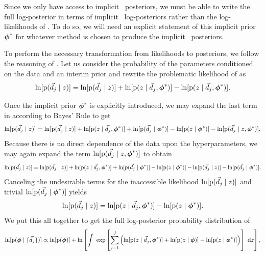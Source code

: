 Since we only have access to implicit \pz\ posteriors, we must be able to write the full log-posterior in terms of implicit \pz\ log-posteriors rather than the log-likelihoods of .
To do so, we will need an explicit statement of this implicit prior ${\boldsymbol{\phi}}^{*}$ for whatever method is chosen to produce the implicit \pz\ posteriors.  

To perform the necessary transformation from likelihoods to posteriors, we follow the reasoning of \citet{Foreman-Mackey2014}.  
Let us consider the probability of the parameters conditioned on the data and an interim prior and rewrite the problematic likelihood of  as 
\begin{equation}
\eqlabel{eq:trick}
\ln[\pr{\data_{j} \gvn z}] = \ln[\pr{\data_{j} \gvn z}] + \ln[\pr{z \gvn \data_{j}, \ndphi^{*}}] - \ln[\pr{z \gvn \data_{j}, \ndphi^{*}}].
\end{equation}

Once the implicit prior ${\boldsymbol{\phi}}^{*}$ is explicitly introduced, we may expand the last term in  according to Bayes' Rule to get 
\begin{equation}
\eqlabel{eq:expand}
\ln[\pr{\data_{j} \gvn z}] = \ln[\pr{\data_{j} \gvn z}] + \ln[\pr{z \gvn \data_{j}, \ndphi^{*}}] + \ln[\pr{\data_{j} \gvn \ndphi^{*}}] - \ln[\pr{z \gvn \ndphi^{*}}] - \ln[\pr{\data_{j} \gvn z, \ndphi^{*}}].
\end{equation}
Because there is no direct dependence of the data upon the hyperparameters, we may again expand the term $\ln[\mathrm{p}(\vec{d}_{j} \mid z, {\boldsymbol{\phi}}^{*})]$ to obtain 
\begin{equation}
\eqlabel{eq:indterm}
\ln[\pr{\vec{d}_{j} \gvn z}] = \ln[\pr{\data_{j} \gvn z}] + \ln[\pr{z \gvn \data_{j}, \ndphi^{*}}] + \ln[\pr{\data_{j} \gvn \ndphi^{*}}] - \ln[\pr{z \gvn \ndphi^{*}}] - \ln[\pr{\data_{j} \gvn z}] - \ln[\pr{\data_{j} \gvn \ndphi^{*}}].
\end{equation}
Canceling the undesirable terms for the inaccessible likelihood $\ln[\mathrm{p}(\vec{d}_{j} \mid z)]$ and trivial $\ln[\mathrm{p}(\vec{d}_{j} \mid {\ensuremath{\boldsymbol{\phi}}}^{*})]$ yields
\begin{equation}
\eqlabel{eq:cancel}
\ln[\pr{\data_{j} \gvn z}] = \ln[\pr{z \gvn \data_{j}, \ndphi^{*}}]  - \ln[\pr{z \gvn \ndphi^{*}}].
\end{equation}
We put this all together to get the full log-posterior probability distribution of 
\begin{equation}
\eqlabel{eq:final}
\ln[\pr{\ndphi \gvn \{\data_{j}\}}] \propto \ln[\pr{\ndphi}] + \ln \left[\integral{\exp \left[\sum_{j=1}^{J} \left(\ln[\pr{z \gvn \data_{j}, \ndphi^{*}}] + \ln[\pr{z \gvn \ndphi}] - \ln[\pr{z \gvn \ndphi^{*}}]\right)\right]}{z}\right] ,
\end{equation}

